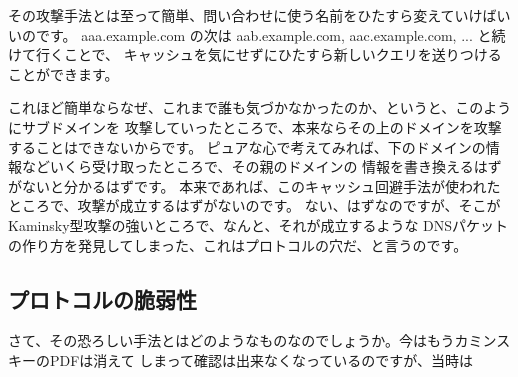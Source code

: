 その攻撃手法とは至って簡単、問い合わせに使う名前をひたすら変えていけばいいのです。
aaa.example.com の次は aab.example.com, aac.example.com, ... と続けて行くことで、
キャッシュを気にせずにひたすら新しいクエリを送りつけることができます。

これほど簡単ならなぜ、これまで誰も気づかなかったのか、というと、このようにサブドメインを
攻撃していったところで、本来ならその上のドメインを攻撃することはできないからです。
ピュアな心で考えてみれば、下のドメインの情報などいくら受け取ったところで、その親のドメインの
情報を書き換えるはずがないと分かるはずです。
本来であれば、このキャッシュ回避手法が使われたところで、攻撃が成立するはずがないのです。
ない、はずなのですが、そこがKaminsky型攻撃の強いところで、なんと、それが成立するような
DNSパケットの作り方を発見してしまった、これはプロトコルの穴だ、と言うのです。

\subsection{プロトコルの脆弱性}
さて、その恐ろしい手法とはどのようなものなのでしょうか。今はもうカミンスキーのPDFは消えて
しまって確認は出来なくなっているのですが、当時は

\begin{figure}[t]
\begin{screen}
 \vspace*{3mm}
\end{screen}
\end{figure}

